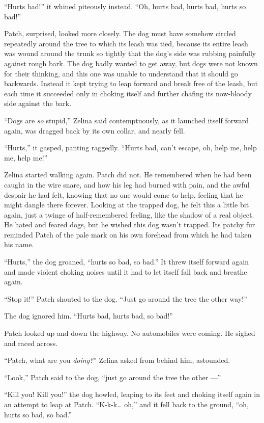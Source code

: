 \documentclass[ebook,oneside,openany,17pt]{memoir}
\begin{document}
“Hurts bad!” it whined piteously instead. “Oh, hurts bad, hurts bad,
hurts so bad!”

Patch, surprised, looked more closely. The dog must have somehow
circled repeatedly around the tree to which its leash was tied,
because its entire leash was wound around the trunk so tightly that
the dog’s side was rubbing painfully against rough bark. The dog badly
wanted to get away, but dogs were not known for their thinking, and
this one was unable to understand that it should go backwards. Instead
it kept trying to leap forward and break free of the leash, but each
time it succeeded only in choking itself and further chafing its
now-bloody side against the bark.

“Dogs are \emph{so} stupid,” Zelina said contemptuously, as it
launched itself forward again, was dragged back by its own collar, and
nearly fell.

“Hurts,” it gasped, panting raggedly. “Hurts bad, can’t escape, oh,
help me, help me, help me!”

Zelina started walking again. Patch did not. He remembered when he had
been caught in the wire snare, and how his leg had burned with pain,
and the awful despair he had felt, knowing that no one would come to
help, feeling that he might dangle there forever. Looking at the
trapped dog, he felt this a little bit again, just a twinge of
half-remembered feeling, like the shadow of a real object. He hated
and feared dogs, but he wished this dog wasn’t trapped. Its patchy fur
reminded Patch of the pale mark on his own forehead from which he had
taken his name.

“Hurts,” the dog groaned, “hurts so bad, so bad.” It threw itself
forward again and made violent choking noises until it had to let
itself fall back and breathe again.

“Stop it!” Patch shouted to the dog. “Just go around the tree the
other way!”

The dog ignored him. “Hurts bad, hurts bad, so bad!”

Patch looked up and down the highway. No automobiles were coming. He
sighed and raced across.

“Patch, what are you \emph{doing?}” Zelina asked from behind him,
astounded.

“Look,” Patch said to the dog, “just go around the tree the other —”

“Kill you! Kill you!” the dog howled, leaping to its feet and choking
itself again in an attempt to leap at Patch. “K-k-k… oh,” and it fell
back to the ground, “oh, hurts so bad, so bad.”
\end{document}
